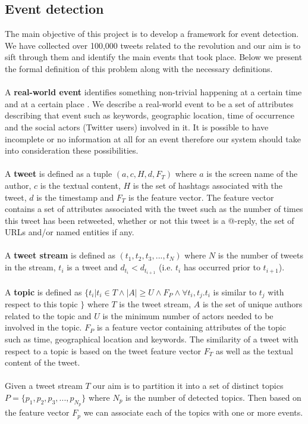 \subsection{Event detection }\label{sec:EventDetection}
The main objective of this project is to develop a framework for event detection. We have collected over 100,000 tweets related to the revolution and our aim is to sift through them and identify the main events that took place. Below we present the formal definition of this problem along with the necessary definitions.\\\\
A \textbf{real-world event} identifies something non-trivial happening at a certain time and at a certain place \cite{Yang99learningapproaches}. We describe a real-world event to be a set of attributes describing that event such as keywords, geographic location, time of occurrence and the social actors (Twitter users) involved in it. It is possible to have incomplete or no information at all for an event therefore our system should take into consideration these possibilities.\\\\
A \textbf{tweet} is defined as a tuple $(a, c, H, d, F_T)$ where \boldmath  $a$ \unboldmath is the screen name of the author, \boldmath $c$  \unboldmath is the textual content, $H$ is the set of hashtags associated with the tweet, \boldmath $d$ \unboldmath is the timestamp and $F_T$ is the feature vector.  The feature vector contains a set of attributes associated with the tweet such as the number of times this tweet has been retweeted, whether or not this tweet is a @-reply, the set of URLs and/or named entities if any.\\\\
A \textbf{tweet stream} is defined as $(t_1, t_2, t_3,..., t_N)$ where $N$ is the number of tweets in the stream, $t_i$ is a tweet and $d_{t_i} < d_{t_{i+1}}$ (i.e. $t_i$ has occurred prior to $t_{i+1}$).\\\\
A \textbf{topic} is defined as $ \{t_i | t_i \in T \wedge |A| \geq U \wedge F_P \wedge \forall t_i, t_j. t_i$ is similar to $t_j$ with respect to this topic $\}$ where $T$ is the tweet stream, $A$ is the set of unique authors related to the topic and $U$ is the minimum number of actors needed to be involved in the topic. $F_P$ is a feature vector containing attributes of the topic such as time, geographical location and keywords. The similarity of a tweet with respect to a topic is based on the tweet feature vector $F_T$ as well as the textual content of the tweet.\\\\
Given a tweet stream $T$ our aim is to partition it into a set of distinct topics $P = \{p_1, p_2, p_3,..., p_{N_p}\}$ where $N_p$ is the number of detected topics. Then based on the feature vector $F_p$ we can associate each of the topics with one or more events.   

